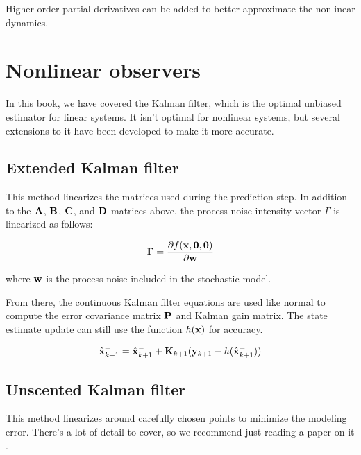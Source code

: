 Higher order partial derivatives can be added to better approximate the
nonlinear dynamics.

\section{Nonlinear observers}

In this book, we have covered the Kalman filter, which is the optimal unbiased
estimator for linear systems. It isn't optimal for nonlinear systems, but
several extensions to it have been developed to make it more accurate.

\subsection{Extended Kalman filter}

This method linearizes the matrices used during the prediction step. In addition
to the $\mathbf{A}$, $\mathbf{B}$, $\mathbf{C}$, and $\mathbf{D}$ matrices above, the
process noise intensity vector $\Gamma$ is linearized as follows:

\begin{equation*}
  \mathbf{\Gamma} = \frac{\partial f(\mathbf{x}, \mathbf{0}, \mathbf{0})}{\partial \mathbf{w}}
\end{equation*}

where $\mathbf{w}$ is the process noise included in the stochastic model.

From there, the continuous Kalman filter equations are used like normal to
compute the error covariance matrix $\mathbf{P}$ and Kalman gain matrix. The state
estimate update can still use the function $h(\mathbf{x})$ for accuracy.

\begin{equation*}
  \hat{\mathbf{x}}_{k+1}^+ = \hat{\mathbf{x}}_{k+1}^- +
    \mathbf{K}_{k+1}(\mathbf{y}_{k+1} - h(\hat{\mathbf{x}}_{k+1}^-))
\end{equation*}

\subsection{Unscented Kalman filter}

This method linearizes around carefully chosen points to minimize the modeling
error. There's a lot of detail to cover, so we recommend just reading a paper on
it \cite{bib:unscented-kalman-filter}.


